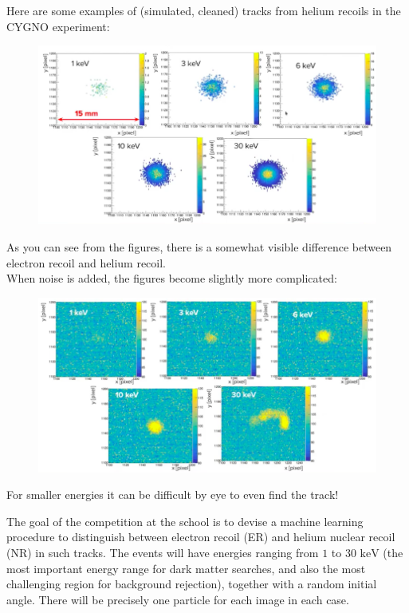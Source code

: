 \newpage
Here are some examples of (simulated, cleaned) tracks from helium recoils in the CYGNO experiment:
\begin{figure}[H]
\centering
\includegraphics[scale=0.4]{heliumtracks.png}
\end{figure}

As you can see from the figures, there is a somewhat visible difference between electron recoil and helium recoil.\\

When noise is added, the figures become slightly more complicated:

\begin{figure}[H]
\centering
\includegraphics[scale=0.4]{noisyelectrontracks.png}
\end{figure}
For smaller energies it can be difficult by eye to even find the track!

\minirule

The goal of the competition at the school is to devise a machine learning procedure to distinguish between electron recoil (ER) and helium nuclear recoil (NR) in such tracks. The events will have energies ranging from $1$ to $30 \textrm{ keV}$ (the most important energy range for dark matter searches, and also the most challenging region for background rejection), together with a random initial angle. There will be precisely one particle for each image in each case.



